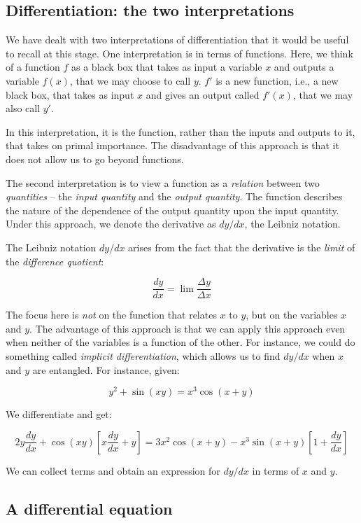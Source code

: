 \documentclass{amsart}
\begin{document}
\subsection{Differentiation: the two interpretations}

We have dealt with two interpretations of differentiation that it
would be useful to recall at this stage. One interpretation is in
terms of functions. Here, we think of a function $f$ as a black box
that takes as input a variable $x$ and outputs a variable $f(x)$, that
we may choose to call $y$. $f'$ is a new function, i.e., a new black
box, that takes as input $x$ and gives an output called $f'(x)$, that
we may also call $y'$.

In this interpretation, it is the function, rather than the inputs and
outputs to it, that takes on primal importance. The disadvantage of
this approach is that it does not allow us to go beyond functions.

The second interpretation is to view a function as a {\em relation}
between two {\em quantities} -- the {\em input quantity} and the {\em
output quantity}. The function describes the nature of the dependence
of the output quantity upon the input quantity. Under this approach,
we denote the derivative as $dy/dx$, the Leibniz notation.

The Leibniz notation $dy/dx$ arises from the fact that the derivative
is the {\em limit} of the {\em difference quotient}:

$$\frac{dy}{dx} = \lim \frac{\Delta y}{\Delta x}$$

The focus here is {\em not} on the function that relates $x$ to $y$,
but on the variables $x$ and $y$. The advantage of this approach is
that we can apply this approach even when neither of the variables is
a function of the other. For instance, we could do something called
{\em implicit differentiation}, which allows us to find $dy/dx$ when
$x$ and $y$ are entangled. For instance, given:

$$y^2 + \sin(xy) = x^3\cos(x + y)$$

We differentiate and get:

$$2y \frac{dy}{dx} + \cos(xy)\left[x\frac{dy}{dx} + y \right] = 3x^2\cos(x + y) - x^3 \sin(x + y)\left[1 + \frac{dy}{dx}\right]$$

We can collect terms and obtain an expression for $dy/dx$ in terms of
$x$ and $y$.

\subsection{A differential equation}
\end{document}
